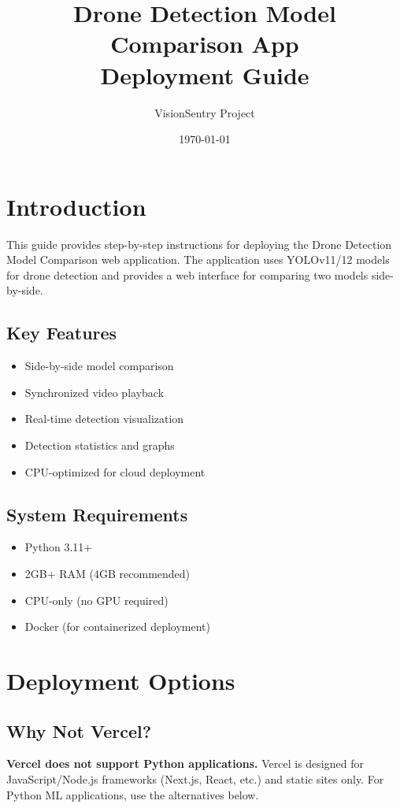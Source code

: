 \documentclass[11pt,a4paper]{article}
\title{\textbf{Drone Detection Model Comparison App\\Deployment Guide}}
\author{VisionSentry Project}
\date{\today}
\begin{document}
\maketitle
\tableofcontents
\newpage

\section{Introduction}

This guide provides step-by-step instructions for deploying the Drone Detection Model Comparison web application. The application uses YOLOv11/12 models for drone detection and provides a web interface for comparing two models side-by-side.

\subsection{Key Features}
\begin{itemize}
    \item Side-by-side model comparison
    \item Synchronized video playback
    \item Real-time detection visualization
    \item Detection statistics and graphs
    \item CPU-optimized for cloud deployment
\end{itemize}

\subsection{System Requirements}
\begin{itemize}
    \item Python 3.11+
    \item 2GB+ RAM (4GB recommended)
    \item CPU-only (no GPU required)
    \item Docker (for containerized deployment)
\end{itemize}

\section{Deployment Options}

\subsection{Why Not Vercel?}

\begin{tcolorbox}[colback=red!5!white,colframe=red!75!black,title=Important Note]
\textbf{Vercel does not support Python applications.} Vercel is designed for JavaScript/Node.js frameworks (Next.js, React, etc.) and static sites only. For Python ML applications, use the alternatives below.
\end{tcolorbox}
\end{document}
